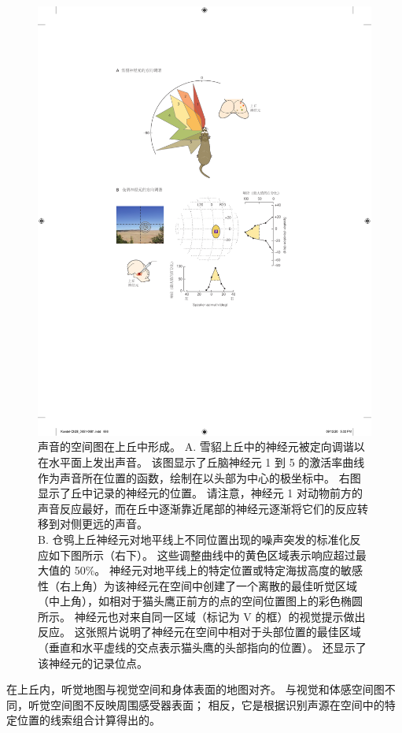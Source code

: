 \begin{figure}[htbp]
	\centering
	\includegraphics[width=0.8\linewidth]{chap28/fig_28_8}
	\caption{声音的空间图在上丘中形成。 
		A. 雪貂上丘中的神经元被定向调谐以在水平面上发出声音。 
		该图显示了丘脑神经元 1 到 5 的激活率曲线作为声音所在位置的函数，绘制在以头部为中心的极坐标中。
		右图显示了丘中记录的神经元的位置。 
		请注意，神经元 1 对动物前方的声音反应最好，而在丘中逐渐靠近尾部的神经元逐渐将它们的反应转移到对侧更远的声音\cite{king1999sensory}。\\
		B. 仓鸮上丘神经元对地平线上不同位置出现的噪声突发的标准化反应如下图所示（右下）。
		这些调整曲线中的黄色区域表示响应超过最大值的 50\%。
		神经元对地平线上的特定位置或特定海拔高度的敏感性（右上角）为该神经元在空间中创建了一个离散的最佳听觉区域（中上角），如相对于猫头鹰正前方的点的空间位置图上的彩色椭圆所示。
		神经元也对来自同一区域（标记为 V 的框）的视觉提示做出反应。
		这张照片说明了神经元在空间中相对于头部位置的最佳区域（垂直和水平虚线的交点表示猫头鹰的头部指向的位置）。
		还显示了该神经元的记录位点\cite{cohen1999maps}。}
	\label{fig:28_8}
\end{figure}


在上丘内，听觉地图与视觉空间和身体表面的地图对齐。
与视觉和体感空间图不同，听觉空间图不反映周围感受器表面；
相反，它是根据识别声源在空间中的特定位置的线索组合计算得出的。


